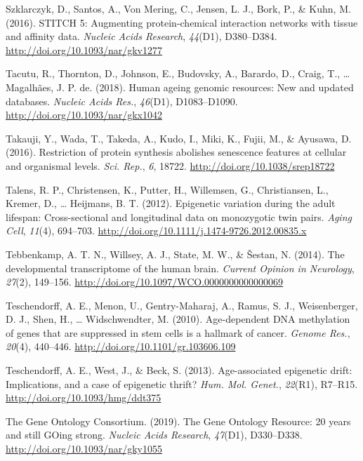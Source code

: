 \documentclass[12pt,twoside]{unicam}
\begin{document}
\begin{cslreferences}
\leavevmode\hypertarget{ref-Szklarczyk2016}{}%
Szklarczyk, D., Santos, A., Von Mering, C., Jensen, L. J., Bork, P., \& Kuhn, M. (2016). STITCH 5: Augmenting protein-chemical interaction networks with tissue and affinity data. \emph{Nucleic Acids Research}, \emph{44}(D1), D380--D384. \url{http://doi.org/10.1093/nar/gkv1277}

\leavevmode\hypertarget{ref-Tacutu2018}{}%
Tacutu, R., Thornton, D., Johnson, E., Budovsky, A., Barardo, D., Craig, T., \ldots{} Magalhães, J. P. de. (2018). Human ageing genomic resources: New and updated databases. \emph{Nucleic Acids Res.}, \emph{46}(D1), D1083--D1090. \url{http://doi.org/10.1093/nar/gkx1042}

\leavevmode\hypertarget{ref-Takauji2016}{}%
Takauji, Y., Wada, T., Takeda, A., Kudo, I., Miki, K., Fujii, M., \& Ayusawa, D. (2016). Restriction of protein synthesis abolishes senescence features at cellular and organismal levels. \emph{Sci. Rep.}, \emph{6}, 18722. \url{http://doi.org/10.1038/srep18722}

\leavevmode\hypertarget{ref-Talens2012}{}%
Talens, R. P., Christensen, K., Putter, H., Willemsen, G., Christiansen, L., Kremer, D., \ldots{} Heijmans, B. T. (2012). Epigenetic variation during the adult lifespan: Cross-sectional and longitudinal data on monozygotic twin pairs. \emph{Aging Cell}, \emph{11}(4), 694--703. \url{http://doi.org/10.1111/j.1474-9726.2012.00835.x}

\leavevmode\hypertarget{ref-Tebbenkamp2014}{}%
Tebbenkamp, A. T. N., Willsey, A. J., State, M. W., \& Šestan, N. (2014). The developmental transcriptome of the human brain. \emph{Current Opinion in Neurology}, \emph{27}(2), 149--156. \url{http://doi.org/10.1097/WCO.0000000000000069}

\leavevmode\hypertarget{ref-Teschendorff2010}{}%
Teschendorff, A. E., Menon, U., Gentry-Maharaj, A., Ramus, S. J., Weisenberger, D. J., Shen, H., \ldots{} Widschwendter, M. (2010). Age-dependent DNA methylation of genes that are suppressed in stem cells is a hallmark of cancer. \emph{Genome Res.}, \emph{20}(4), 440--446. \url{http://doi.org/10.1101/gr.103606.109}

\leavevmode\hypertarget{ref-Teschendorff2013}{}%
Teschendorff, A. E., West, J., \& Beck, S. (2013). Age-associated epigenetic drift: Implications, and a case of epigenetic thrift? \emph{Hum. Mol. Genet.}, \emph{22}(R1), R7--R15. \url{http://doi.org/10.1093/hmg/ddt375}

\leavevmode\hypertarget{ref-TheGeneOntologyConsortium2019}{}%
The Gene Ontology Consortium. (2019). The Gene Ontology Resource: 20 years and still GOing strong. \emph{Nucleic Acids Research}, \emph{47}(D1), D330--D338. \url{http://doi.org/10.1093/nar/gky1055}


\end{cslreferences}
\end{document}

